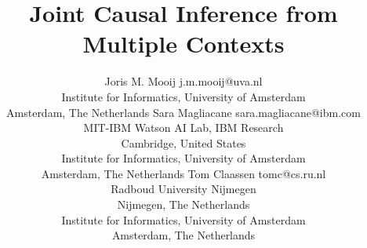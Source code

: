 \documentclass[twoside,11pt]{article}
\begin{document}
\title{Joint Causal Inference from Multiple Contexts}

\author{\name Joris M. Mooij \email j.m.mooij@uva.nl\\
  \addr Institute for Informatics, University of Amsterdam\\
  \addr Amsterdam, The Netherlands
  \AND 
  \name Sara Magliacane \email sara.magliacane@ibm.com\\
  \addr MIT-IBM Watson AI Lab, IBM Research\\
  \addr Cambridge, United States\\[0.5\baselineskip]
  \addr Institute for Informatics, University of Amsterdam\\
  \addr Amsterdam, The Netherlands
  \AND
  \name Tom Claassen \email tomc@cs.ru.nl\\
  \addr Radboud University Nijmegen\\
  \addr Nijmegen, The Netherlands\\[0.5\baselineskip]
  \addr Institute for Informatics, University of Amsterdam\\
  \addr Amsterdam, The Netherlands
}


\maketitle
\end{document}
